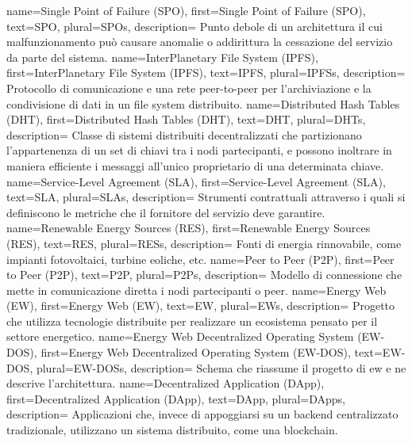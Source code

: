 {
    name={Single Point of Failure (SPO)},
    first={Single Point of Failure (SPO)},
    text={SPO},
    plural={SPOs},
    description={
            Punto debole di un architettura il cui malfunzionamento può causare anomalie o addirittura la cessazione del servizio da parte del sistema.
        }
}
{
    name={InterPlanetary File System (IPFS)},
    first={InterPlanetary File System (IPFS)},
    text={IPFS},
    plural={IPFSs},
    description={
            Protocollo di comunicazione e una rete peer-to-peer per l'archiviazione e la condivisione di dati in un file system distribuito.
        }
}
{
    name={Distributed Hash Tables (DHT)},
    first={Distributed Hash Tables (DHT)},
    text={DHT},
    plural={DHTs},
    description={
            Classe di sistemi distribuiti decentralizzati che partizionano l'appartenenza di un set di chiavi tra i nodi partecipanti,
            e possono inoltrare in maniera efficiente i messaggi all'unico proprietario di una determinata chiave.
        }
}
{
    name={Service-Level Agreement (SLA)},
    first={Service-Level Agreement (SLA)},
    text={SLA},
    plural={SLAs},
    description={
            Strumenti contrattuali attraverso i quali si definiscono le metriche che il fornitore del servizio deve garantire.
        }
}
{
    name={Renewable Energy Sources (RES)},
    first={Renewable Energy Sources (RES)},
    text={RES},
    plural={RESs},
    description={
            Fonti di energia rinnovabile, come impianti fotovoltaici, turbine eoliche, etc.
        }
}
{
    name={Peer to Peer (P2P)},
    first={Peer to Peer (P2P)},
    text={P2P},
    plural={P2Ps},
    description={
            Modello di connessione che mette in comunicazione diretta i nodi partecipanti o peer.
        }
}
{
    name={Energy Web (EW)},
    first={Energy Web (EW)},
    text={EW},
    plural={EWs},
    description={
            Progetto che utilizza tecnologie distribuite per realizzare un ecosistema pensato per il settore energetico.
        }
}
{
    name={Energy Web Decentralized Operating System (EW-DOS)},
    first={Energy Web Decentralized Operating System (EW-DOS)},
    text={EW-DOS},
    plural={EW-DOSs},
    description={
            Schema che riassume il progetto di \gls{ew} e ne descrive l'architettura.
        }
}
{
    name={Decentralized Application (DApp)},
    first={Decentralized Application (DApp)},
    text={DApp},
    plural={DApps},
    description={
            Applicazioni che, invece di appoggiarsi su un backend centralizzato tradizionale,
            utilizzano un sistema distribuito, come una blockchain.
        }
}
